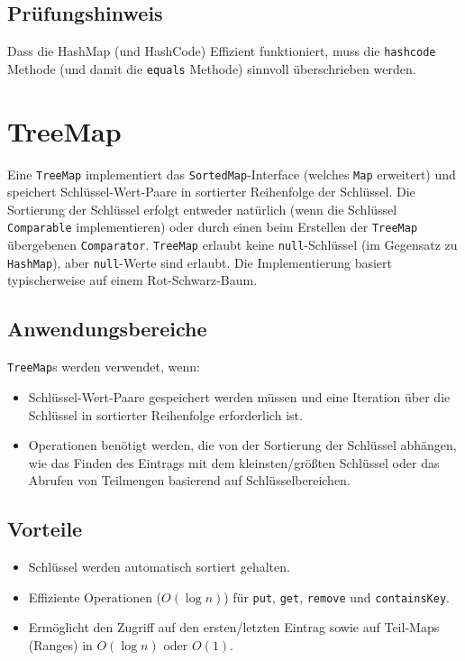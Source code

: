 \subsection{Prüfungshinweis}
Dass die HashMap (und HashCode) Effizient funktioniert, muss die \lstinline{hashcode} Methode (und damit die \lstinline{equals} Methode) sinnvoll überschrieben werden. 

\section{TreeMap}
Eine \texttt{TreeMap} implementiert das \texttt{SortedMap}-Interface (welches \texttt{Map} erweitert) und speichert Schlüssel-Wert-Paare in sortierter Reihenfolge der Schlüssel. Die Sortierung der Schlüssel erfolgt entweder natürlich (wenn die Schlüssel \texttt{Comparable} implementieren) oder durch einen beim Erstellen der \texttt{TreeMap} übergebenen \texttt{Comparator}. \texttt{TreeMap} erlaubt keine \texttt{null}-Schlüssel (im Gegensatz zu \texttt{HashMap}), aber \texttt{null}-Werte sind erlaubt. Die Implementierung basiert typischerweise auf einem Rot-Schwarz-Baum.

\subsection{Anwendungsbereiche}
\texttt{TreeMap}s werden verwendet, wenn:
\begin{itemize}
    \item Schlüssel-Wert-Paare gespeichert werden müssen und eine Iteration über die Schlüssel in sortierter Reihenfolge erforderlich ist.
    \item Operationen benötigt werden, die von der Sortierung der Schlüssel abhängen, wie das Finden des Eintrags mit dem kleinsten/größten Schlüssel oder das Abrufen von Teilmengen basierend auf Schlüsselbereichen.
\end{itemize}

\subsection{Vorteile}
\begin{itemize}
    \item Schlüssel werden automatisch sortiert gehalten.
    \item Effiziente Operationen ($O(\log n)$) für \texttt{put}, \texttt{get}, \texttt{remove} und \texttt{containsKey}.
    \item Ermöglicht den Zugriff auf den ersten/letzten Eintrag sowie auf Teil-Maps (Ranges) in $O(\log n)$ oder $O(1)$.
\end{itemize}

